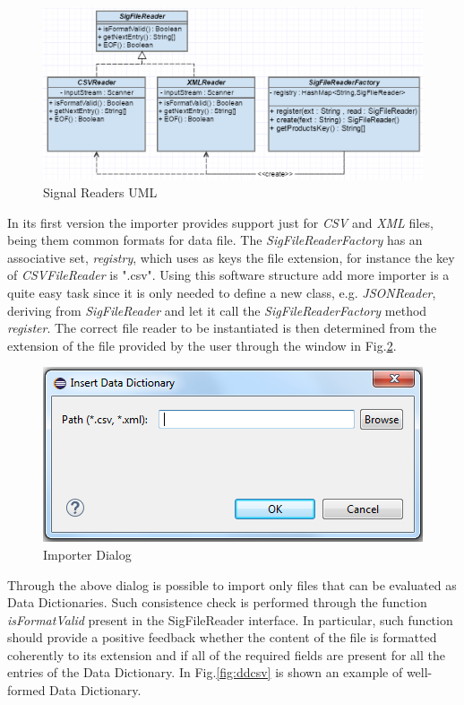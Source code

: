 \begin{figure}[!h]
\centering
\includegraphics[width=.9\textwidth]{Figs/ddimpUML.PNG}
\caption{Signal Readers UML}
\label{fig:ddimpuml}
\end{figure}
In its first version the importer provides support just for \textit{CSV} and \textit{XML} files, being them common formats for data file. The \textit{SigFileReaderFactory} has an associative set, \textit{registry}, which uses as keys the file extension, for instance the key of \textit{CSVFileReader} is ".csv". Using this software structure add more importer is a quite easy task since it is only needed to define a new class, e.g. \textit{JSONReader}, deriving from \textit{SigFileReader} and let it call the \textit{SigFileReaderFactory} method \textit{register}. The correct file reader to be instantiated is then determined from the extension of the file provided by the user through the window in Fig.\ref{fig:ddwin}.

\begin{figure}[!h]
\centering
\includegraphics[width=.5\textwidth]{Figs/ddwin.PNG}
\caption{Importer Dialog}
\label{fig:ddwin}
\end{figure}
Through the above dialog is possible to import only files that can be evaluated as Data Dictionaries. Such consistence check is performed through the function \textit{isFormatValid} present in the SigFileReader interface. In particular, such function should provide a positive feedback whether the content of the file is formatted coherently to its extension and if all of the required fields are present for all the entries of the Data Dictionary. In Fig.\ref{fig:ddcsv} is shown an example of well-formed Data Dictionary.

